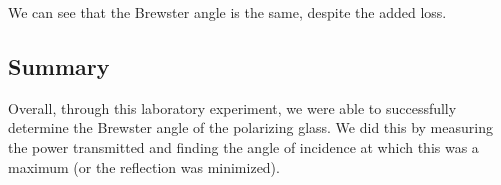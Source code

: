 \documentclass[
	letterpaper, %
	10pt, %
]{CSUniSchoolLabReport}
\begin{document}
\begin{enumerate}
We can see that the Brewster angle is the same, despite the added loss.

\end{enumerate}

\subsection{Summary}

Overall, through this laboratory experiment, we were able to successfully determine the Brewster angle of the polarizing glass. We did this by measuring the power transmitted and finding the angle of incidence at which this was a maximum (or the reflection was minimized).
\end{document}
